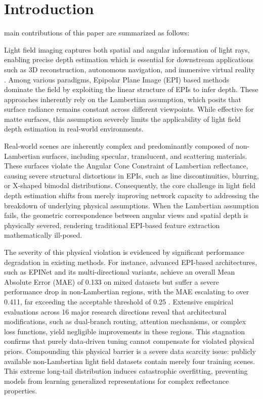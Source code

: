 \documentclass[lettersize,journal]{IEEEtran}
\begin{document}
\section{Introduction}

 main contributions of this paper are summarized as follows:

Light field imaging captures both spatial and angular information of light rays, enabling precise depth estimation which is essential for downstream applications such as 3D reconstruction, autonomous navigation, and immersive virtual reality \cite{he2016}. Among various paradigms, Epipolar Plane Image (EPI) based methods dominate the field by exploiting the linear structure of EPIs to infer depth. These approaches inherently rely on the Lambertian assumption, which posits that surface radiance remains constant across different viewpoints. While effective for matte surfaces, this assumption severely limits the applicability of light field depth estimation in real-world environments.

Real-world scenes are inherently complex and predominantly composed of non-Lambertian surfaces, including specular, translucent, and scattering materials. These surfaces violate the Angular Cone Constraint of Lambertian reflectance, causing severe structural distortions in EPIs, such as line discontinuities, blurring, or X-shaped bimodal distributions. Consequently, the core challenge in light field depth estimation shifts from merely improving network capacity to addressing the breakdown of underlying physical assumptions. When the Lambertian assumption fails, the geometric correspondence between angular views and spatial depth is physically severed, rendering traditional EPI-based feature extraction mathematically ill-posed.

The severity of this physical violation is evidenced by significant performance degradation in existing methods. For instance, advanced EPI-based architectures, such as EPINet and its multi-directional variants, achieve an overall Mean Absolute Error (MAE) of 0.133 on mixed datasets but suffer a severe performance drop in non-Lambertian regions, with the MAE escalating to over 0.411, far exceeding the acceptable threshold of 0.25 \cite{vaswani2017}. Extensive empirical evaluations across 16 major research directions reveal that architectural modifications, such as dual-branch routing, attention mechanisms, or complex loss functions, yield negligible improvements in these regions. This stagnation confirms that purely data-driven tuning cannot compensate for violated physical priors. Compounding this physical barrier is a severe data scarcity issue: publicly available non-Lambertian light field datasets contain merely four training scenes. This extreme long-tail distribution induces catastrophic overfitting, preventing models from learning generalized representations for complex reflectance properties.
\end{document}
